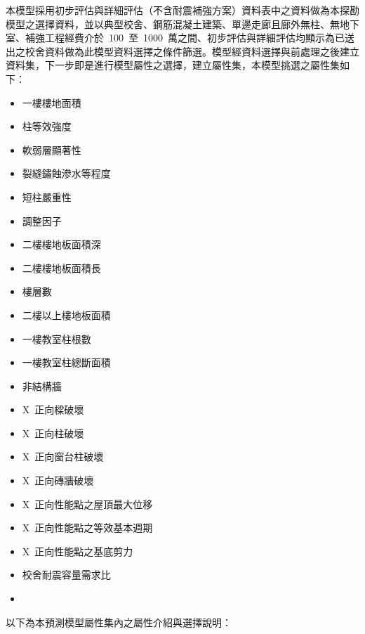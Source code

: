 本模型採用初步評估與詳細評估（不含耐震補強方案）資料表中之資料做為本探勘模型之選擇資料，並以典型校舍、鋼筋混凝土建築、單邊走廊且廊外無柱、無地下室、補強工程經費介於~100~至~1000~萬之間、初步評估與詳細評估均顯示為已送出之校舍資料做為此模型資料選擇之條件篩選。模型經資料選擇與前處理之後建立資料集，下一步即是進行模型屬性之選擇，建立屬性集，本模型挑選之屬性集如下：

\begin{multicols}{2}
\begin{itemize}
\item 一樓樓地面積
\item 柱等效強度
\item 軟弱層顯著性
\item 裂縫鏽蝕滲水等程度
\item 短柱嚴重性
\item 調整因子
\item 二樓樓地板面積深
\item 二樓樓地板面積長
\item 樓層數
\item 二樓以上樓地板面積
\item 一樓教室柱根數
\item 一樓教室柱總斷面積
\item 非結構牆
\item X~正向樑破壞
\item X~正向柱破壞
\item X~正向窗台柱破壞
\item X~正向磚牆破壞
\item X~正向性能點之屋頂最大位移
\item X~正向性能點之等效基本週期
\item X~正向性能點之基底剪力
\item 校舍耐震容量需求比
\item[]
\end{itemize}
\end{multicols}

以下為本預測模型屬性集內之屬性介紹與選擇說明：

